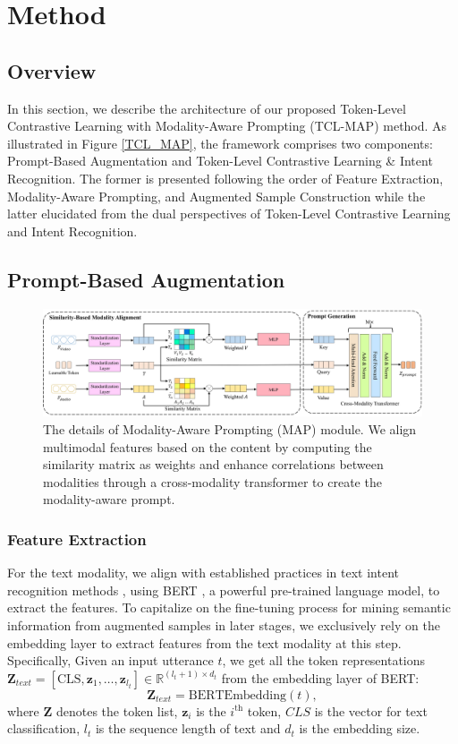 \documentclass[letterpaper]{article} %
\begin{document}
\section{Method}
\subsection{Overview}
In this section, we describe the architecture of our proposed Token-Level Contrastive Learning with Modality-Aware Prompting (TCL-MAP) method. As illustrated in Figure \ref{TCL_MAP}, the framework comprises two components: Prompt-Based Augmentation and Token-Level Contrastive Learning \& Intent Recognition. The former is presented following the order of Feature Extraction, Modality-Aware Prompting, and Augmented Sample Construction while the latter elucidated from the dual perspectives of Token-Level Contrastive Learning and Intent Recognition.

\subsection{Prompt-Based Augmentation}
\begin{figure}[t!]
\centering
\includegraphics[scale=.21]{Figs/MAP.pdf}
\caption{\protect \label{MAP} The details of Modality-Aware Prompting (MAP) module. We align multimodal features based on the content by computing the similarity matrix as weights and enhance correlations between modalities through a cross-modality transformer to create the modality-aware prompt.
}
\end{figure}
\subsubsection{Feature Extraction}
For the text modality, we align with established practices in text intent recognition methods \cite{10349963, 10097558}, using BERT \cite{devlin2018bert}, a powerful pre-trained language model, to extract the features. To capitalize on the fine-tuning process for mining semantic information from augmented samples in later stages, we exclusively rely on the embedding layer to extract features from the text modality at this step. Specifically, Given an input utterance $t$, we get all the token representations $\textbf{Z}_{text} = [\text{CLS}, \textbf{z}_{1}, \dots, \textbf{z}_{l_{t}}] \in \mathbb{R}^{(l_{t}+1) \times d_{t}}$ from the embedding layer of BERT:
\begin{equation}
\textbf{Z}_{text} = \text{BERTEmbedding}(t),
\end{equation}
where $\textbf{Z}$ denotes the token list, $\textbf{z}_{i}$ is the $i^{\text{th}}$ token, $CLS$ is the vector for text classification, $l_{t}$ is the sequence length of text and $d_{t}$ is the embedding size.
\end{document}
